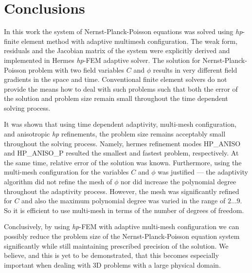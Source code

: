 \section{Conclusions}

In this work the system of Nernst-Planck-Poisson equations
was solved using \emph{hp}-finite element method with adaptive
multimesh configuration. The weak form, residuals and
the Jacobian matrix of the system were explicitly derived
and implemented in Hermes \emph{hp}-FEM adaptive solver.
The solution for Nernst-Planck-Poisson
problem with two field variables $C$ and $\phi$ results in 
very different field gradients in the space and time.
Conventional finite element solvers do not provide the means 
how to deal with such problems such that both the error of
the solution and problem size remain small throughout the
time dependent solving process.

It was shown that using time dependent adaptivity, multi-mesh
configuration, and anisotropic \emph{hp} refinements, the problem
size remains acceptably small throughout the solving process.
Namely, hermes refinement modes HP\_ANISO and HP\_ANISO\_P
resulted the smallest and fastest problem, respectively.
At the same time, relative error of the solution was known.
Furthermore, using the multi-mesh configuration for the variables
$C$ and $\phi$ was justified --- the adaptivity algorithm
did not refine the mesh of $\phi$ nor did increase the
polynomial degree throughout the adaptivity process. However,
the mesh was significantly refined for $C$ and also the
maximum polynomial degree was varied in the range of
$2\ldots 9$. So it is efficient to use multi-mesh in terms of
the number of degrees of freedom.

Conclusively, by using \emph{hp}-FEM with adaptive multi-mesh
configuration we can possibly reduce the problem size
of the Nernst-Planck-Poisson equation system significantly while
still maintaining prescribed precision of the solution. 
We believe, and this
is yet to be demonstrated, that this becomes especially
important when dealing with 3D problems with a large physical
domain.
